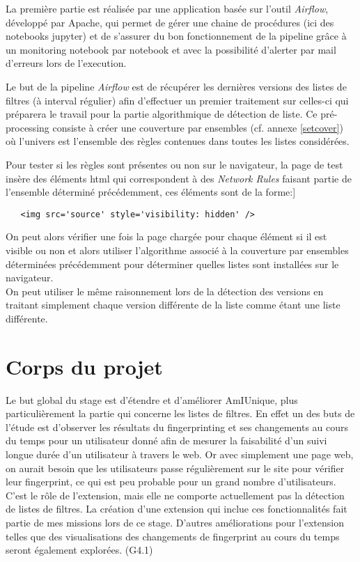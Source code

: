 \documentclass[oneside,a4paper,12pt]{article}
\begin{document}
La première partie est réalisée par une application basée sur l'outil \textit{Airflow}, développé par Apache, qui permet de gérer une chaine de procédures (ici des notebooks jupyter) et de s'assurer du bon fonctionnement de la pipeline grâce à un monitoring notebook par notebook et avec la possibilité d'alerter par mail d'erreurs lors de l'execution.

Le but de la pipeline \textit{Airflow} est de récupérer les dernières versions des listes de filtres (à interval régulier) afin d'effectuer un premier traitement sur celles-ci qui préparera le travail pour la partie algorithmique de détection de liste. Ce pré-processing consiste à créer une couverture par ensembles (cf. annexe \ref{setcover}) où l'univers est l'ensemble des règles contenues dans toutes les listes considérées.

Pour tester si les règles sont présentes ou non sur le navigateur, la page de test insère des éléments html qui correspondent à des \textit{Network Rules} faisant partie de l'ensemble déterminé précédemment, ces éléments sont de la forme:]
\begin{center}
\begin{lstlisting}
   <img src='source' style='visibility: hidden' />
\end{lstlisting}
\end{center}

On peut alors vérifier une fois la page chargée pour chaque élément si il est visible ou non et alors utiliser l'algorithme associé à la couverture par ensembles déterminées précédemment pour déterminer quelles listes sont installées sur le navigateur.\\

On peut utiliser le même raisonnement lors de la détection des versions en traitant simplement chaque version différente de la liste comme étant une liste différente.


\section{Corps du projet}\label{Projet}

Le but global du stage est d'étendre et d'améliorer AmIUnique, plus particulièrement la partie qui concerne les listes de filtres. En effet un des buts de l'étude est d'observer les résultats du fingerprinting et ses changements au cours du temps pour un utilisateur donné afin de mesurer la faisabilité d'un suivi longue durée d'un utilisateur à travers le web.
Or avec simplement une page web, on aurait besoin que les utilisateurs passe régulièrement sur le site pour vérifier leur fingerprint, ce qui est peu probable pour un grand nombre d'utilisateurs.
C'est le rôle de l'extension, mais elle ne comporte actuellement pas la détection de listes de filtres. La création d'une extension qui inclue ces fonctionnalités fait partie de mes missions lors de ce stage. D'autres améliorations pour l'extension telles que des visualisations des changements de fingerprint au cours du temps seront également explorées. (G4.1)
\end{document}
